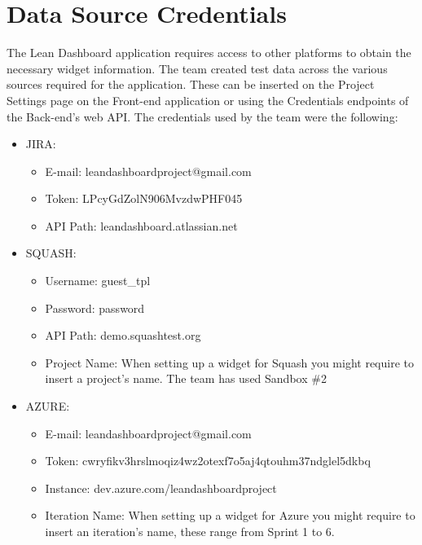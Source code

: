 \documentclass{article}
\begin{document}
\section{Data Source Credentials}
The Lean Dashboard application requires access to other platforms to obtain the necessary widget information. The team created test data across the various sources required for the application. These can be inserted on the Project Settings page on the Front-end application or using the Credentials endpoints of the Back-end's web API.
The credentials used by the team were the following:
\begin{itemize}
 \item JIRA:
	\begin{itemize}
	  \item E-mail: leandashboardproject@gmail.com
	  \item Token: LPcyGdZolN906MvzdwPHF045
	  \item API Path: leandashboard.atlassian.net
	\end{itemize}
 \item SQUASH:
	\begin{itemize}
	  \item Username: guest\_tpl
	  \item Password: password
	  \item API Path: demo.squashtest.org
	  \item Project Name: When setting up a widget for Squash you might require to insert a project's name. The team has used Sandbox \#2
	\end{itemize}
 \item AZURE:
	\begin{itemize}
	  \item E-mail: leandashboardproject@gmail.com
	  \item Token: cwryfikv3hrslmoqiz4wz2otexf7o5aj4qtouhm37ndglel5dkbq
	  \item Instance: dev.azure.com/leandashboardproject
	  \item Iteration Name: When setting up a widget for Azure you might require to insert an iteration's name, these range from Sprint 1 to 6.
	\end{itemize}
\end{itemize}
\end{document}
